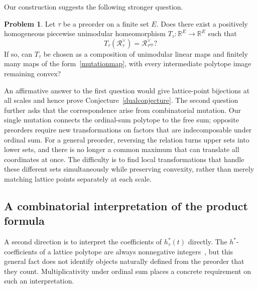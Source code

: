 \documentclass[11pt,reqno]{amsart}
\numberwithin{equation}{section}
\theoremstyle{definition}
\theoremstyle{remark}
\theoremstyle{definition}
\newtheorem{problem}[theorem]{Problem}
\newcommand{\Rpoly}[1]{\mathcal R_{#1}^{\vee}}
\begin{document}
Our construction suggests the following stronger question.
\begin{problem}\label{dualgeometry}
Let $\tau$ be a preorder on a finite set $E$. Does there exist a positively homogeneous piecewise unimodular homeomorphism
$T_\tau:\mathbb R^E\to\mathbb R^E$ such that
\[
 T_\tau(\Rpoly{\tau})=\Rpoly{\tau^{\mathrm{op}}}?
\]
If so, can $T_\tau$ be chosen as a composition of unimodular linear maps and finitely many maps of the form~\eqref{mutationmap}, with every intermediate polytope image remaining convex?
\end{problem}
An affirmative answer to the first question would give lattice-point bijections at all scales and hence prove Conjecture~\ref{dualconjecture}. The second question further asks that the correspondence arise from combinatorial mutation. Our single mutation connects the ordinal-sum polytope to the free sum; opposite preorders require new transformations on factors that are indecomposable under ordinal sum. For a general preorder, reversing the relation turns upper sets into lower sets, and there is no longer a common maximum that can translate all coordinates at once. The difficulty is to find local transformations that handle these different sets simultaneously while preserving convexity, rather than merely matching lattice points separately at each scale.

\subsection{A combinatorial interpretation of the product formula}
A second direction is to interpret the coefficients of $h_\tau^*(t)$ directly. The $h^*$-coefficients of a lattice polytope are always nonnegative integers~\cite[Section~3.5]{BR}, but this general fact does not identify objects naturally defined from the preorder that they count. Multiplicativity under ordinal sum places a concrete requirement on such an interpretation.
\end{document}
